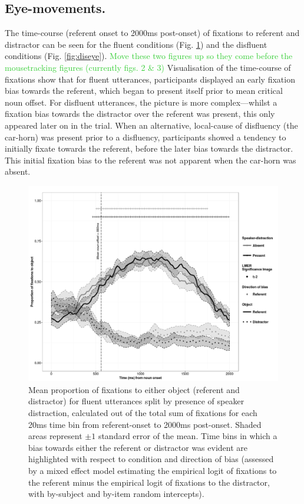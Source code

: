 \documentclass[a4paper,man,natbib]{apa6}
\newcommand\thenote[1]{\textcolor{LimeGreen}{#1}}
\begin{document}
\subsection{Eye-movements.}
The time-course (referent onset to 2000ms post-onset) of fixations to referent and distractor can be seen for the fluent conditions (Fig. \ref{fig:flueye}) and the disfluent conditions (Fig. \ref{fig:diseye}). 
\thenote{Move these two figures up so they come before the mousetracking figures (currently figs. 2 \& 3)}
Visualisation of the time-course of fixations show that for fluent utterances, participants displayed an early fixation bias towards the referent, which began to present itself prior to mean critical noun offset. 
For disfluent utterances, the picture is more complex---whilst a fixation bias towards the distractor over the referent was present, this only appeared later on in the trial.
When an alternative, local-cause of disfluency (the car-horn) was present prior to a disfluency, participants showed a tendency to initially fixate towards the referent, before the later bias towards the distractor. 
This initial fixation bias to the referent was not apparent when the car-horn was absent.


\begin{figure}[Ht]
  \centering
	\includegraphics[scale=.5]{fluent.png}
  \caption{Mean proportion of fixations to either object (referent and distractor) for fluent utterances split by presence of speaker distraction, calculated out of the total sum of fixations for each 20ms time bin from referent-onset to 2000ms post-onset. Shaded areas represent $\pm 1$ standard error of the mean. Time bins in which a bias towards either the referent or distractor was evident are highlighted with respect to condition and direction of bias (assessed by a mixed effect model estimating the empirical logit of fixations to the referent minus the empirical logit of fixations to the distractor, with by-subject and by-item random intercepts).}
  \label{fig:flueye}
\end{figure}
\end{document}
